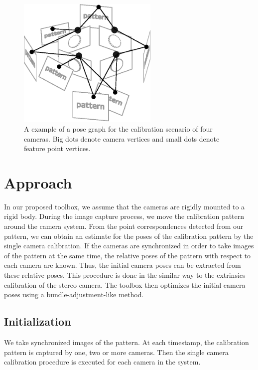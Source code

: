 \documentclass{report}
\begin{document}
\begin{figure}
\centering
\includegraphics[width=0.6\textwidth]{images/graphsample}
\caption{A example of a pose graph for the calibration scenario of four cameras. Big dots denote camera vertices and small dots denote feature point vertices.}
\label{graphSampleFig}
\end{figure}

\label{extrinsicSec}

\section{Approach}
In our proposed toolbox, we assume that the cameras are rigidly mounted to a rigid body. During the image capture process, we move the calibration pattern around the camera system. From the point correspondences detected from our pattern, we can obtain an estimate for the poses of the calibration pattern by the single camera calibration. If the cameras are synchronized in order to take images of the pattern at the same time, the relative poses of the pattern with respect to each camera are known. Thus, the initial camera poses can be extracted from these relative poses. This procedure is done in the similar way to the extrinsics calibration of the stereo camera. The toolbox then optimizes the initial camera poses using a bundle-adjustment-like method. 

\subsection{Initialization}
We take synchronized images of the pattern. At each timestamp, the calibration pattern is captured by one, two or more cameras. Then the single camera calibration procedure is executed for each camera in the system. 
\end{document}
